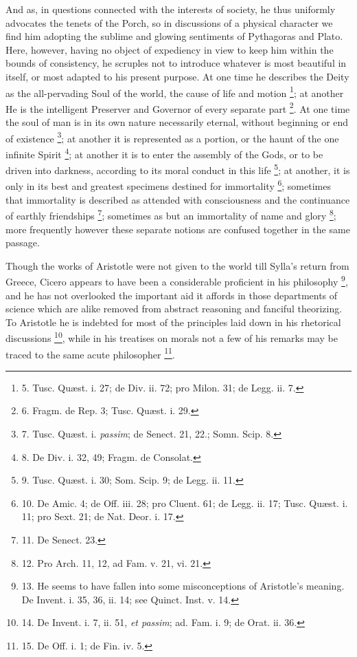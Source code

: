 And as, in questions connected
with the interests of society, he thus uniformly advocates the tenets
of the Porch, so in discussions of a physical character we find him
adopting the sublime and glowing sentiments of Pythagoras and Plato.
Here, however, having no object of expediency in view to keep him
within the bounds of consistency, he scruples not to introduce
whatever is most beautiful in itself, or most adapted to his present
purpose. At one time he describes the Deity as the all-pervading Soul
of the world, the cause of life and motion \footnote{5. Tusc. Quæst. i. 27; de
Div. ii. 72; pro Milon. 31; de Legg. ii. 7.}; at another He is
the intelligent Preserver and Governor of every separate part \footnote{6. Fragm. de Rep. 3;
Tusc. Quæst. i. 29.}. At one time the soul of man is in its own nature necessarily
eternal, without beginning or end of existence \footnote{7. Tusc. Quæst. i. \emph{passim};
de Senect. 21, 22.; Somn. Scip. 8.}; at another it
is represented as a portion, or the haunt of the one infinite
Spirit \footnote{8. De Div. i. 32, 49; Fragm.
de Consolat.}; at another it is to enter the assembly of the Gods,
or to be driven into darkness, according to its moral conduct in this
life \footnote{9. Tusc. Quæst. i. 30; Som.
Scip. 9; de Legg. ii. 11.}; at another, it is only in its best and greatest
specimens destined for immortality \footnote{10. De Amic. 4; de Off. iii.
28; pro Cluent. 61; de Legg. ii. 17; Tusc. Quæst. i. 11; pro Sext.
21; de Nat. Deor. i. 17.}; sometimes that
immortality is described as attended with consciousness and the
continuance of earthly friendships \footnote{11. De
Senect. 23.}; sometimes as but an
immortality of name and glory \footnote{12. Pro Arch. 11, 12, ad Fam.
v. 21, vi. 21.}; more frequently however these
separate notions are confused together in the same passage.

Though the works of Aristotle
were not given to the world till Sylla's return from Greece, Cicero
appears to have been a considerable proficient in his philosophy \footnote{13. He seems to have fallen
into some misconceptions of Aristotle's meaning. De Invent. i. 35,
36, ii. 14; see Quinct. Inst. v. 14.}, and he has not overlooked the important aid it affords in those
departments of science which are alike removed from abstract reasoning
and fanciful theorizing. To Aristotle he is indebted for most of the
principles laid down in his rhetorical discussions \footnote{14. De Invent. i. 7, ii. 51, \emph{et
passim}; ad. Fam. i. 9; de Orat. ii. 36.}, while in
his treatises on morals not a few of his remarks may be traced to the
same acute philosopher \footnote{15. De Off. i. 1; de Fin. iv.
5.}.

